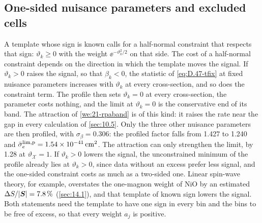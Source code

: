 \subsection{One-sided nuisance parameters and excluded cells}\label{sec:21.4-onesided}

A template whose sign is known calls for a half-normal constraint that respects that sign: $\vartheta_k \ge 0$ with the weight $\ee^{-\vartheta_k^2/2}$ on that side. The cost of a half-normal constraint depends on the direction in which the template moves the signal. If $\vartheta_k > 0$ raises the signal, so that $\beta_k < 0$, the statistic of \cref{eq:D.47-tfix} at fixed nuisance parameters increases with $\vartheta_k$ at every cross-section, and so does the constraint term. The profile then sets $\vartheta_k = 0$ at every cross-section, the parameter costs nothing, and the limit at $\vartheta_k = 0$ is the conservative end of its band. The attraction of \cref{we:21-rpaband} is of this kind: it raises the rate near the gap in every calculation of \cref{sec:10.5}. Only the three other nuisance parameters are then profiled, with $\sigma_\beta = 0.306$: the profiled factor falls from 1.427 to 1.240 and $\bar{\sigma}_{e}^{\mathrm{lim,p}} = \SI{1.54e-41}{cm^2}$. The attraction can only strengthen the limit, by 1.28 at $\vartheta_{\mathcal{X}} = 1$. If $\vartheta_k > 0$ lowers the signal, the unconstrained minimum of the profile already lies at $\vartheta_k > 0$, since data without an excess prefer less signal, and the one-sided constraint costs as much as a two-sided one. Linear spin-wave theory, for example, overstates the one-magnon weight of NiO by an estimated $\Delta S/|\bm{S}| = \SI{7.8}{\percent}$ (\cref{sec:14.1}), and that template of known sign lowers the signal. Both statements need the template to have one sign in every bin and the bins to be free of excess, so that every weight $a_j$ is positive.

